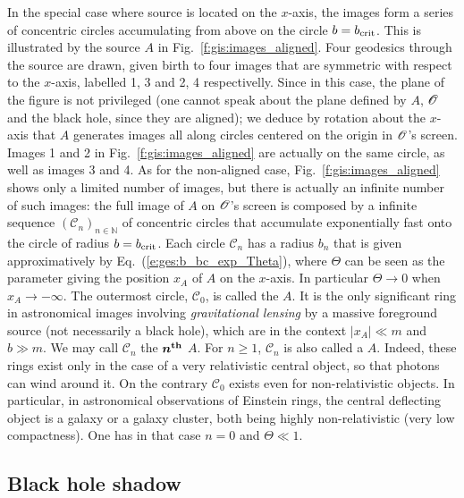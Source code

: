 In the special case where source is located on the $x$-axis, the images form
a series of concentric circles accumulating from above on the circle
$b = b_{\rm crit}$. This is illustrated by the source $A$ in
Fig.~\ref{f:gis:images_aligned}. Four geodesics through the source are drawn,
given birth to four images that
are symmetric with respect to the $x$-axis, labelled 1, 3 and 2, 4 respectivelly.
Since in this case, the plane of the figure is not privileged (one cannot speak
about the plane defined by $A$, $\mathscr{O}$ and the black hole, since they are aligned);
we deduce by rotation about the $x$-axis that $A$ generates images all along
circles centered on the origin in $\mathscr{O}$'s screen. Images 1 and 2 in Fig.~\ref{f:gis:images_aligned}
are actually on the same circle, as well as images 3 and 4.
As for the non-aligned case, Fig.~\ref{f:gis:images_aligned} shows only a limited number of
images, but there is actually an infinite number of such images: the full image
of $A$ on $\mathscr{O}$'s screen is composed by a infinite sequence $(\mathscr{C}_n)_{n\in\mathbb{N}}$
of concentric circles
that accumulate exponentially fast onto the circle of radius $b = b_{\rm crit}$.
Each circle $\mathscr{C}_n$ has a radius $b_n$ that is given approximatively
by Eq.~(\ref{e:ges:b_bc_exp_Theta}), where $\Theta$ can be seen as the parameter
giving the position $x_A$ of $A$ on the $x$-axis. In particular $\Theta\to 0$
when $x_A\to -\infty$.
The outermost circle, $\mathscr{C}_0$, is called the
 $A$.
It is the only significant ring in astronomical images involving \emph{gravitational
lensing} by a massive foreground source (not necessarily
a black hole), which are in the context $|x_A|\ll m$ and $b\gg m$.
We may call $\mathscr{C}_n$ the $\bm{n^{\rm th}}$ $A$.
For $n\geq 1$, $\mathscr{C}_n$ is also called a 
$A$. Indeed, these rings exist only in the case of a very relativistic central object, so that
photons can wind around it. On the contrary $\mathscr{C}_0$ exists even for non-relativistic
objects. In particular, in astronomical observations of Einstein rings, the
central deflecting object is a galaxy or a galaxy cluster,
both being highly non-relativistic (very low compactness). One has in that case
$n=0$ and $\Theta\ll 1$.

\subsection{Black hole shadow}

